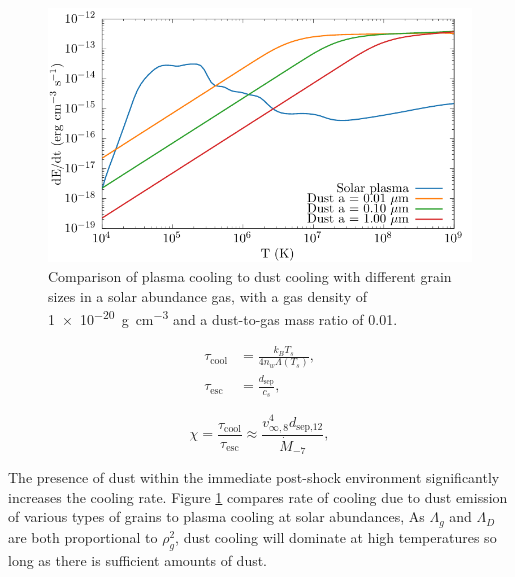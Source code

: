 \parencite{schureNewRadiativeCooling2009}
\parencite{rybickiRadiativeProcessesAstrophysics2004}

\begin{figure}
  \centering
  \includegraphics{assets/dust-plasma-cooling-comparison/cooling-comparison.pdf}
  \caption[Dust cooling vs. plasma cooling]{Comparison of plasma cooling to dust cooling with different grain sizes in a solar abundance gas, with a gas density of \SI{1e-20}{\gram\per\centi\metre\cubed} and a dust-to-gas mass ratio of 0.01.}
  \label{fig:dustplasmacomparison}
\end{figure}



\begin{subequations}
  \begin{align}
    \tau_\text{cool} & = \frac{k_B T_s}{4n_w \Lambda(T_s)} \label{eq:taucool} ,\\ 
    \tau_\text{esc}  & = \frac{d_\text{sep}}{c_s} \label{eq:tauesc} ,
  \end{align}
\end{subequations}

\begin{equation}
  \chi = \frac{\tau_\text{cool}}{\tau_\text{esc}} \approx \frac{v^4_{\infty,8} d_\text{sep,12}}{\dot M_{-7}} \label{eq:coolingparameter} ,
\end{equation}

The presence of dust within the immediate post-shock environment significantly increases the cooling rate.
Figure \ref{fig:dustplasmacomparison} compares rate of cooling due to dust emission of various types of grains to plasma cooling at solar abundances, 
As $\Lambda_g$ and $\Lambda_D$ are both proportional to $\rho_g^2$, dust cooling will dominate at high temperatures so long as there is sufficient amounts of dust.

